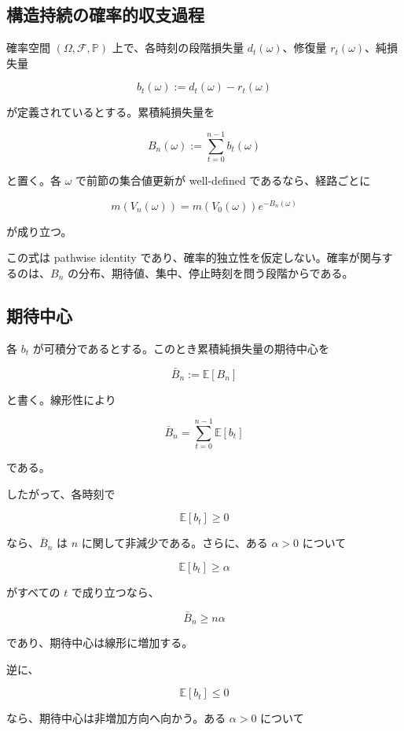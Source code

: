 \documentclass[12pt,a4paper]{article}
\begin{document}
\subsection{構造持続の確率的収支過程}\label{ux69cbux9020ux6301ux7d9aux306eux78baux7387ux7684ux53ceux652fux904eux7a0b}

確率空間 \((\Omega,\mathcal F,\mathbb P)\) 上で、各時刻の段階損失量 \(d_{t}(\omega)\)、修復量 \(r_{t}(\omega)\)、純損失量

\[
b_{t}(\omega) := d_{t}(\omega)-r_{t}(\omega)
\]

が定義されているとする。累積純損失量を

\[
B_{n}(\omega) := \sum_{t=0}^{n-1} b_{t}(\omega)
\]

と置く。各 \(\omega\) で前節の集合値更新が well-defined であるなら、経路ごとに

\[
m(V_{n}(\omega)) = m(V_0(\omega)) e^{-B_{n}(\omega)}
\]

が成り立つ。

この式は pathwise identity であり、確率的独立性を仮定しない。確率が関与するのは、\(B_{n}\) の分布、期待値、集中、停止時刻を問う段階からである。

\subsection{期待中心}\label{ux671fux5f85ux4e2dux5fc3}

各 \(b_{t}\) が可積分であるとする。このとき累積純損失量の期待中心を

\[
\bar B_{n} := \mathbb E[B_{n}]
\]

と書く。線形性により

\[
\bar B_{n} = \sum_{t=0}^{n-1} \mathbb E[b_{t}]
\]

である。

したがって、各時刻で

\[
\mathbb E[b_{t}] \ge 0
\]

なら、\(\bar B_{n}\) は \(n\) に関して非減少である。さらに、ある \(\alpha>0\) について

\[
\mathbb E[b_{t}] \ge \alpha
\]

がすべての \(t\) で成り立つなら、

\[
\bar B_{n} \ge n\alpha
\]

であり、期待中心は線形に増加する。

逆に、

\[
\mathbb E[b_{t}] \le 0
\]

なら、期待中心は非増加方向へ向かう。ある \(\alpha>0\) について
\end{document}
